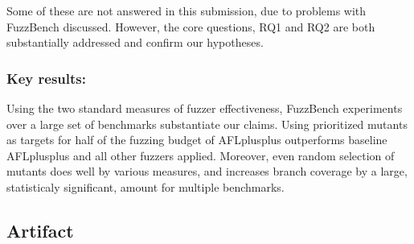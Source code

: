 \documentclass[manuscript,screen,review]{acmart}
\begin{document}
    Some of these are not answered in this submission, due to problems
    with FuzzBench discussed.  However, the core questions, RQ1 and
    RQ2 are both substantially addressed and confirm our hypotheses.

\subsubsection{Key results:} Using the two standard measures of fuzzer
effectiveness, FuzzBench experiments over a large set of benchmarks
substantiate our claims.  Using prioritized mutants as targets for
half of the fuzzing budget of AFLplusplus outperforms baseline
AFLplusplus and all other fuzzers applied.  Moreover, even random
selection of mutants does well by various measures, and increases
branch coverage by a large, statisticaly significant, amount for
multiple benchmarks.


\subsection{Artifact}
\end{document}
